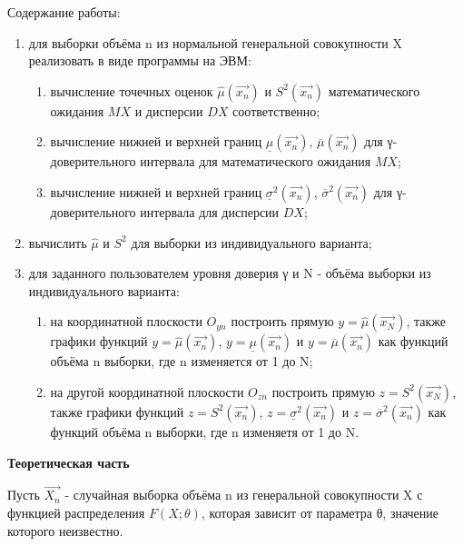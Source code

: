 \documentclass[12pt,a4paper]{scrartcl}
\begin{document}
Содержание работы:
\begin{enumerate}
	\item для выборки объёма n из нормальной генеральной совокупности X реализовать в виде программы на ЭВМ:
	\begin{enumerate}
		\item вычисление точечных оценок $\hat{μ}(\overrightarrow {x_n})$ и $S^2(\overrightarrow {x_n})$ математического ожидания $MX$ и дисперсии $DX$ соответственно;
		\item вычисление нижней и верхней границ $\underline {μ}(\overrightarrow {x_n})$, $\overline {μ}(\overrightarrow {x_n})$ для γ-доверительного интервала для математического ожидания $MX$;
		\item вычисление нижней и верхней границ $\underline {σ}^2 (\overrightarrow {x_n})$, $\overline {σ}^2 (\overrightarrow {x_n})$ для γ-доверительного интервала для дисперсии $DX$;
	\end{enumerate}
	\item вычислить $\hat{μ}$ и $S^2$ для выборки из индивидуального варианта;
	\item для заданного пользователем уровня доверия γ и N - объёма выборки из индивидуального варианта:
	\begin{enumerate}
		\item на координатной плоскости $O_{yn}$ построить прямую $y = \hat{μ}(\overrightarrow {x_N})$, также графики функций $y = \hat{μ}(\overrightarrow {x_n})$, $y = \underline {μ}(\overrightarrow {x_n})$ и $y = \overline {μ}(\overrightarrow {x_n})$ как функций объёма n выборки, где n изменяется от 1 до N;
		\item на другой координатной плоскости $O_{zn}$ построить прямую $z = S^2(\overrightarrow {x_N})$, также графики функций $z = S^2(\overrightarrow {x_n})$, $z = \underline {σ}^2 (\overrightarrow {x_n})$ и $z = \overline {σ}^2 (\overrightarrow {x_n})$ как функций объёма n выборки, где n изменяетя от 1 до N.
	\end{enumerate}
\end{enumerate}

\newpage
{}
\begin{center}
\textbf {Теоретическая часть}
\end{center}

Пусть $\overrightarrow {X_n}$ - случайная выборка объёма n из генеральной совокупности X с функцией распределения $F(X; θ)$, которая зависит от параметра θ, значение которого неизвестно.
\end{document}
